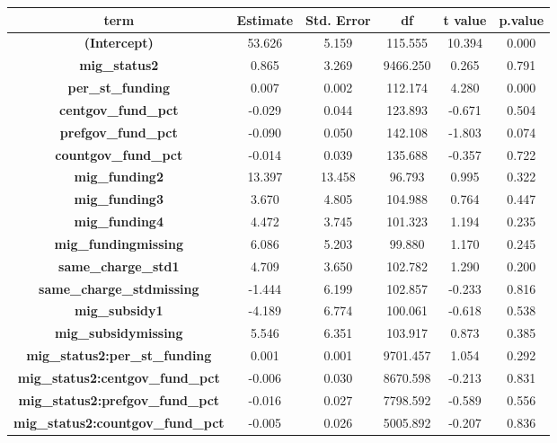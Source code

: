 \documentclass[
  man,
  floatsintext,
  longtable,
  nolmodern,
  notxfonts,
  notimes,
  colorlinks=true,linkcolor=blue,citecolor=blue,urlcolor=blue]{apa7}
\begin{document}
\begin{table}

{\caption{{The effect of education funding on average Mathematics exam
scores differences within
schools}{\label{tbl-math-achivement-comparison}}}
\vspace{-20pt}}

\begingroup\fontsize{10}{12}\selectfont

\begin{longtable*}[t]{>{}cccccc}
\toprule
term & Estimate & Std. Error & df & t value & p.value\\
\midrule
\textbf{(Intercept)} & 53.626 & 5.159 & 115.555 & 10.394 & 0.000\\
\textbf{mig\_status2} & 0.865 & 3.269 & 9466.250 & 0.265 & 0.791\\
\textbf{per\_st\_funding} & 0.007 & 0.002 & 112.174 & 4.280 & 0.000\\
\textbf{centgov\_fund\_pct} & -0.029 & 0.044 & 123.893 & -0.671 & 0.504\\
\textbf{prefgov\_fund\_pct} & -0.090 & 0.050 & 142.108 & -1.803 & 0.074\\
\addlinespace
\textbf{countgov\_fund\_pct} & -0.014 & 0.039 & 135.688 & -0.357 & 0.722\\
\textbf{mig\_funding2} & 13.397 & 13.458 & 96.793 & 0.995 & 0.322\\
\textbf{mig\_funding3} & 3.670 & 4.805 & 104.988 & 0.764 & 0.447\\
\textbf{mig\_funding4} & 4.472 & 3.745 & 101.323 & 1.194 & 0.235\\
\textbf{mig\_fundingmissing} & 6.086 & 5.203 & 99.880 & 1.170 & 0.245\\
\addlinespace
\textbf{same\_charge\_std1} & 4.709 & 3.650 & 102.782 & 1.290 & 0.200\\
\textbf{same\_charge\_stdmissing} & -1.444 & 6.199 & 102.857 & -0.233 & 0.816\\
\textbf{mig\_subsidy1} & -4.189 & 6.774 & 100.061 & -0.618 & 0.538\\
\textbf{mig\_subsidymissing} & 5.546 & 6.351 & 103.917 & 0.873 & 0.385\\
\textbf{mig\_status2:per\_st\_funding} & 0.001 & 0.001 & 9701.457 & 1.054 & 0.292\\
\addlinespace
\textbf{mig\_status2:centgov\_fund\_pct} & -0.006 & 0.030 & 8670.598 & -0.213 & 0.831\\
\textbf{mig\_status2:prefgov\_fund\_pct} & -0.016 & 0.027 & 7798.592 & -0.589 & 0.556\\
\textbf{mig\_status2:countgov\_fund\_pct} & -0.005 & 0.026 & 5005.892 & -0.207 & 0.836\\

\end{longtable*}
\end{table}
\end{document}
